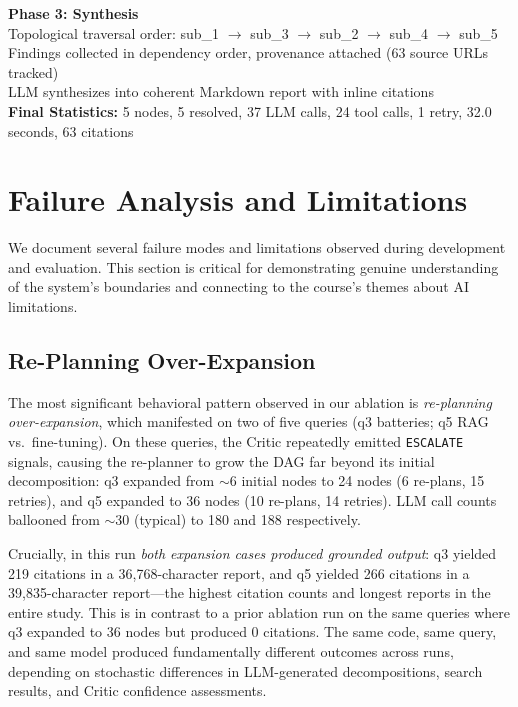 \documentclass[11pt]{article}
\begin{document}
\begin{tcolorbox}[boxstyle, title={Full Agent Trace --- q1}]
\textbf{Phase 3: Synthesis} \\
Topological traversal order: sub\_1 $\to$ sub\_3 $\to$ sub\_2 $\to$ sub\_4 $\to$ sub\_5 \\
Findings collected in dependency order, provenance attached (63 source URLs tracked) \\
LLM synthesizes into coherent Markdown report with inline citations \\[4pt]

\textbf{Final Statistics:} 5 nodes, 5 resolved, 37 LLM calls, 24 tool calls, 1 retry, 32.0 seconds, 63 citations
\end{tcolorbox}

\section{Failure Analysis and Limitations}
\label{sec:failure}

We document several failure modes and limitations observed during development and evaluation. This section is critical for demonstrating genuine understanding of the system's boundaries and connecting to the course's themes about AI limitations.

\subsection{Re-Planning Over-Expansion}

The most significant behavioral pattern observed in our ablation is \emph{re-planning over-expansion}, which manifested on two of five queries (q3 batteries; q5 RAG vs.\ fine-tuning). On these queries, the Critic repeatedly emitted \texttt{ESCALATE} signals, causing the re-planner to grow the DAG far beyond its initial decomposition: q3 expanded from $\sim$6 initial nodes to 24 nodes (6 re-plans, 15 retries), and q5 expanded to 36 nodes (10 re-plans, 14 retries). LLM call counts ballooned from $\sim$30 (typical) to 180 and 188 respectively.

Crucially, in this run \emph{both expansion cases produced grounded output}: q3 yielded 219 citations in a 36{,}768-character report, and q5 yielded 266 citations in a 39{,}835-character report---the highest citation counts and longest reports in the entire study. This is in contrast to a prior ablation run on the same queries where q3 expanded to 36 nodes but produced 0 citations. The same code, same query, and same model produced fundamentally different outcomes across runs, depending on stochastic differences in LLM-generated decompositions, search results, and Critic confidence assessments.
\end{document}
